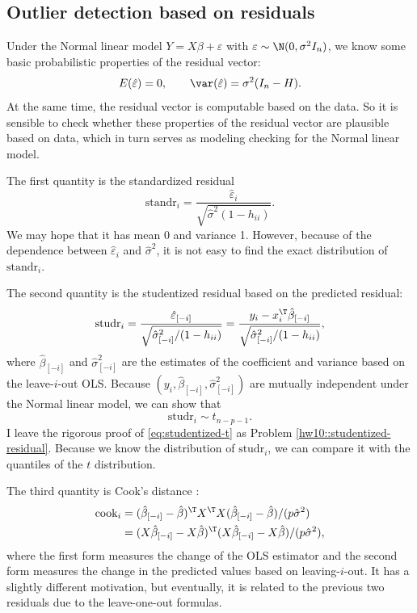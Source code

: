 \subsection{Outlier detection based on residuals}

Under the Normal linear model $Y=X\beta+\varepsilon$ with $\varepsilon\sim\N(0,\sigma^{2}I_{n})$,
we know some basic probabilistic properties of the residual vector:
\[
E(\hat{\varepsilon})=0,\qquad\var(\hat{\varepsilon})=\sigma^{2}(I_{n}-H).
\]
At the same time, the residual vector is computable based on the data.
So it is sensible to check whether these properties of the residual
vector are plausible based on data, which in turn serves as modeling
checking for the Normal linear model. 

The first quantity is the standardized residual
\[
\text{standr}_{i}=\frac{\hat{\varepsilon}_{i}}{\sqrt{\hat{\sigma}^{2}(1-h_{ii})}}.
\]
We may hope that it has mean 0 and variance 1. However, because
of the dependence between $\hat{\varepsilon}_{i}$ and $\hat{\sigma}^{2}$, it is not easy to find the exact distribution
of $\text{standr}_{i}$. 

The second quantity is the studentized residual
based on the predicted residual:
\[
\text{studr}_{i}=\frac{\hat{\varepsilon}_{[-i]}}{\sqrt{\hat{\sigma}_{[-i]}^{2}/(1-h_{ii})}}=\frac{y_{i}-x_{i}^{\T}\hat{\beta}_{[-i]}}{\sqrt{\hat{\sigma}_{[-i]}^{2}/(1-h_{ii})}},
\]
where $\hat{\beta}_{[-i]}$ and $\hat{\sigma}_{[-i]}^{2}$ are the estimates of the coefficient and variance based
on the leave-$i$-out OLS. Because $(y_{i},\hat{\beta}_{[-i]},\hat{\sigma}_{[-i]}^{2})$
are mutually independent under the Normal linear model, we can show
that 
\begin{equation}
\text{studr}_{i}\sim t_{n-p-1}.\label{eq:studentized-t}
\end{equation}
I leave the rigorous proof of \eqref{eq:studentized-t} as Problem \ref{hw10::studentized-residual}. 
Because we know the  distribution of $\text{studr}_{i}$, we can compare it with the quantiles of the $t$ distribution. 

The third quantity is Cook's distance \citep{cook1977detection}:
\begin{align*}
\text{cook}_{i} & =(\hat{\beta}_{[-i]}-\hat{\beta})^{\T}X^{\T}X(\hat{\beta}_{[-i]}-\hat{\beta})/(p\hat{\sigma}^{2})\\
 & =(X\hat{\beta}_{[-i]}-X\hat{\beta})^{\T}(X\hat{\beta}_{[-i]}-X\hat{\beta})/(p\hat{\sigma}^{2}),
\end{align*}
 where the first form measures the change of the OLS estimator and
the second form measures the change in the predicted values based
on leaving-$i$-out. It has a slightly different motivation, but
eventually, it is related to the previous two residuals due to the leave-one-out formulas. 

